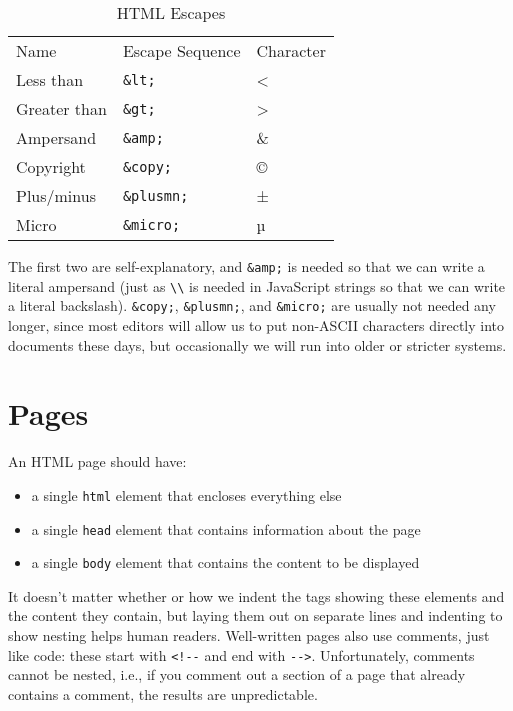\begin{table}
\begin{longtable}{lll}
Name & Escape Sequence & Character \\
Less than & \texttt{\&lt;} & {\textless} \\
Greater than & \texttt{\&gt;} & {\textgreater} \\
Ampersand & \texttt{\&amp;} & \& \\
Copyright & \texttt{\&copy;} & © \\
Plus/minus & \texttt{\&plusmn;} & ± \\
Micro & \texttt{\&micro;} & µ \\
\end{longtable}
\caption{HTML Escapes}
\label{t:htmlcss-escapes}
\end{table}

The first two are self-explanatory,
and \texttt{\&amp;} is needed so that we can write a literal ampersand
(just as \texttt{\textbackslash{}\textbackslash{}} is needed in JavaScript strings so that we can write a literal backslash).
\texttt{\&copy;}, \texttt{\&plusmn;}, and \texttt{\&micro;} are usually not needed any longer,
since most editors will allow us to put non-ASCII characters directly into documents these days,
but occasionally we will run into older or stricter systems.

\section{Pages}\label{s:htmlcss-pages}

An HTML page should have:

\begin{itemize}
\item
  a single \texttt{html} element that encloses everything else
\item
  a single \texttt{head} element that contains information about the page
\item
  a single \texttt{body} element that contains the content to be displayed
\end{itemize}

It doesn't matter whether or how we indent the tags showing these elements and the content they contain,
but laying them out on separate lines
and indenting to show nesting
helps human readers.
Well-written pages also use comments, just like code:
these start with \texttt{{\textless}!-\/-} and end with \texttt{-\/-{\textgreater}}.
Unfortunately,
comments cannot be nested,
i.e.,
if you comment out a section of a page that already contains a comment,
the results are unpredictable.

